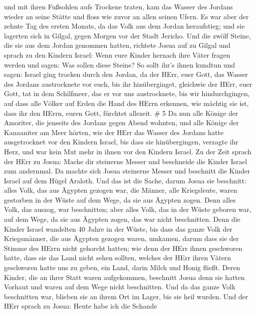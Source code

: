 und mit ihren Fußsohlen aufs Trockene traten, kam das Wasser des Jordans
wieder an seine Stätte und floss wie zuvor an allen seinen Ufern.
 Es war aber der zehnte Tag des ersten Monats, da das Volk
aus dem Jordan heraufstieg; und sie lagerten sich in Gilgal, gegen
Morgen vor der Stadt Jericho.  Und die zwölf Steine, die
sie aus dem Jordan genommen hatten, richtete Josua auf zu Gilgal
 und sprach zu den Kindern Israel: Wenn eure Kinder hernach
ihre Väter fragen werden und sagen: Was sollen diese Steine?
 So sollt ihr's ihnen kundtun und sagen: Israel ging
trocken durch den Jordan,  da der HErr, euer Gott, das
Wasser des Jordans austrocknete vor euch, bis ihr hinüberginget,
gleichwie der HErr, euer Gott, tat in dem Schilfmeer, das er vor uns
austrocknete, bis wir hindurchgingen,  auf dass alle Völker
auf Erden die Hand des HErrn erkennen, wie mächtig sie ist, dass ihr den
HErrn, euren Gott, fürchtet allezeit. \# 5  Da nun alle
Könige der Amoriter, die jenseits des Jordans gegen Abend wohnten, und
alle Könige der Kanaaniter am Meer hörten, wie der HErr das Wasser des
Jordans hatte ausgetrocknet vor den Kindern Israel, bis dass sie
hinübergingen, verzagte ihr Herz, und war kein Mut mehr in ihnen vor den
Kindern Israel.  Zu der Zeit sprach der HErr zu Josua: Mache
dir steinerne Messer und beschneide die Kinder Israel zum andernmal.
 Da machte sich Josua steinerne Messer und beschnitt die
Kinder Israel auf dem Hügel Araloth.  Und das ist die Sache,
darum Josua sie beschnitt: alles Volk, das aus Ägypten gezogen war, die
Männer, alle Kriegsleute, waren gestorben in der Wüste auf dem Wege, da
sie aus Ägypten zogen.  Denn alles Volk, das auszog, war
beschnitten; aber alles Volk, das in der Wüste geboren war, auf dem
Wege, da sie aus Ägypten zogen, das war nicht beschnitten. 
Denn die Kinder Israel wandelten 40 Jahre in der Wüste, bis dass das
ganze Volk der Kriegsmänner, die aus Ägypten gezogen waren, umkamen,
darum dass sie der Stimme des HErrn nicht gehorcht hatten; wie denn der
HErr ihnen geschworen hatte, dass sie das Land nicht sehen sollten,
welches der HErr ihren Vätern geschworen hatte uns zu geben, ein Land,
darin Milch und Honig fließt.  Deren Kinder, die an ihrer
Statt waren aufgekommen, beschnitt Josua denn sie hatten Vorhaut und
waren auf dem Wege nicht beschnitten.  Und da das ganze Volk
beschnitten war, blieben sie an ihrem Ort im Lager, bis sie heil wurden.
 Und der HErr sprach zu Josua: Heute habe ich die Schande
